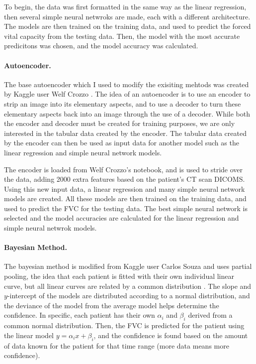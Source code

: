 \documentclass[12pt]{article}
\begin{document}
To begin, the data was first formatted in the same way as the linear regression, then several simple neural netwroks are made, each with a different architecture.
The models are then trained on the training data, and used to predict the forced vital capacity from the testing data.
Then, the model with the most accurate predicitons was chosen, and the model accuracy was calculated.

\paragraph*{Autoencoder.}

The base autoencoder which I used to modify the exisiting mehtods was created by Kaggle user Welf Crozzo \cite{image2vec}. 
The idea of an autoencoder is to use an encoder to strip an image into its elementary aspects, and to use a decoder to turn these elementary aspects back into an image through the use of a decoder.
While both the encoder and decoder must be created for training purposes, we are only interested in the tabular data created by the encoder. 
The tabular data created by the encoder can then be used as input data for another model such as the linear regression and simple neural network models.

The encoder is loaded from Welf Crozzo's notebook, and is used to stride over the data, adding 2000 extra features based on the patient's CT scan DICOMS.
Using this new input data, a linear regression and many simple neural network models are created.
All these models are then trained on the training data, and used to predict the FVC for the testing data.
The best simple neural network is selected and the model accuracies are calculated for the linear regression and simple neural netwrok models.

\paragraph*{Bayesian Method.}

The bayesian method is modified from Kaggle user Carlos Souza and uses partial pooling, the idea that each patient is fitted with their own individual linear curve, but all linear curves are related by a common distribution \cite{bayesian}. 
The slope and $y$-intercept of the models are distributed according to a normal distribution, and the deviance of the model from the average model helps determine the confidence. 
In specific, each patient has their own $\alpha_i$ and $\beta_i$ derived from a common normal distribution. 
Then, the FVC is predicted for the patient using the linear model $y = \alpha_i x + \beta_i$, and the confidence is found based on the amount of data known for the patient for that time range (more data means more confidence).
\end{document}

